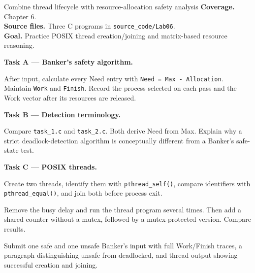 \begin{labproject}{Combine thread lifecycle with resource-allocation safety analysis}
\textbf{Coverage.} Chapter 6.\\
\textbf{Source files.} Three C programs in \texttt{source\_code/Lab06}.\\
\textbf{Goal.} Practice POSIX thread creation/joining and matrix-based resource reasoning.

\medskip\noindent\textbf{Task A --- Banker's safety algorithm.}\par
After input, calculate every Need entry with \texttt{Need = Max - Allocation}. Maintain \texttt{Work} and \texttt{Finish}. Record the process selected on each pass and the Work vector after its resources are released.

\medskip\noindent\textbf{Task B --- Detection terminology.}\par
Compare \texttt{task\_1.c} and \texttt{task\_2.c}. Both derive Need from Max. Explain why a strict deadlock-detection algorithm is conceptually different from a Banker's safe-state test.

\medskip\noindent\textbf{Task C --- POSIX threads.}\par
Create two threads, identify them with \texttt{pthread\_self()}, compare identifiers with \texttt{pthread\_equal()}, and join both before process exit.

\begin{tryit}
Remove the busy delay and run the thread program several times. Then add a shared counter without a mutex, followed by a mutex-protected version. Compare results.
\end{tryit}
\end{labproject}

\begin{labdeliverable}
Submit one safe and one unsafe Banker's input with full Work/Finish traces, a paragraph distinguishing unsafe from deadlocked, and thread output showing successful creation and joining.
\end{labdeliverable}

